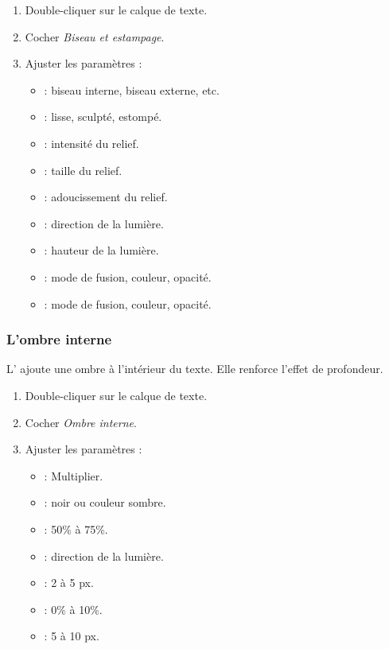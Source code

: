 \begin{enumerate}
    \item Double-cliquer sur le calque de texte.
    \item Cocher \emph{Biseau et estampage}.
    \item Ajuster les paramètres :
    \begin{itemize}
        \item {} : biseau interne, biseau externe, etc.
        \item {} : lisse, sculpté, estompé.
        \item {} : intensité du relief.
        \item {} : taille du relief.
        \item {} : adoucissement du relief.
        \item {} : direction de la lumière.
        \item {} : hauteur de la lumière.
        \item {} : mode de fusion, couleur, opacité.
        \item {} : mode de fusion, couleur, opacité.
    \end{itemize}
\end{enumerate}

\subsubsection{L'ombre interne}

L' ajoute une ombre à l'intérieur du texte. Elle renforce l'effet de profondeur.

\begin{enumerate}
    \item Double-cliquer sur le calque de texte.
    \item Cocher \emph{Ombre interne}.
    \item Ajuster les paramètres :
    \begin{itemize}
        \item {} : Multiplier.
        \item {} : noir ou couleur sombre.
        \item {} : 50\% à 75\%.
        \item {} : direction de la lumière.
        \item {} : 2 à 5 px.
        \item {} : 0\% à 10\%.
        \item {} : 5 à 10 px.
    \end{itemize}
\end{enumerate}

